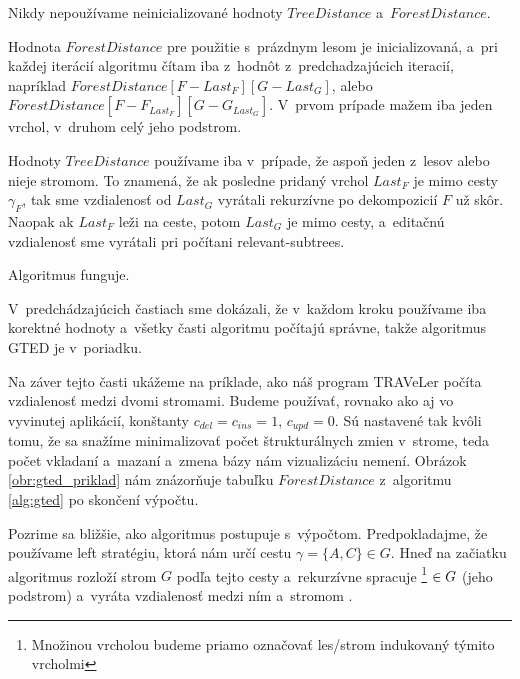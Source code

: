 \begin{lemma}
  Nikdy nepoužívame neinicializované hodnoty $TreeDistance$ a~$ForestDistance$.
\end{lemma}

\begin{dukaz}
  Hodnota $ForestDistance$ pre použitie s~prázdnym lesom je inicializovaná, a~pri každej iterácií
  algoritmu čítam iba z~hodnôt z~predchadzajúcich iteracií, napríklad
  $ForestDistance[F - Last_{F}][G - Last_{G}]$, alebo $ForestDistance[F - F_{Last_{F}}][G - G_{Last_{G}}]$.
  V~prvom prípade mažem iba jeden vrchol, v~druhom celý jeho podstrom.

  Hodnoty $TreeDistance$ používame iba v~prípade, že aspoň jeden z~lesov  alebo  nieje stromom.
  To znamená, že ak posledne pridaný vrchol $Last_{F}$ je mimo cesty $\gamma_{F}$, tak sme vzdialenosť
  od $Last_{G}$ vyrátali rekurzívne po dekompozicií $F$ už skôr.
  Naopak ak $Last_{F}$ leži na ceste, potom $Last_{G}$ je mimo cesty, a~editačnú vzdialenosť
  sme vyrátali pri počítani relevant-subtrees.
\end{dukaz}

\begin{dusl}
  Algoritmus funguje.
\end{dusl}

\begin{dukaz}
  V~predchádzajúcich častiach sme dokázali, že v~každom kroku používame iba korektné hodnoty
  a~všetky časti algoritmu počítajú správne, takže algoritmus GTED je v~poriadku.
\end{dukaz}

Na záver tejto časti ukážeme na príklade, ako náš program TRAVeLer počíta vzdialenosť
medzi dvomi stromami. Budeme používať, rovnako ako aj vo vyvinutej aplikácií,
konštanty $c_{del} = c_{ins} = 1$, $c_{upd} = 0$. Sú nastavené tak
kvôli tomu, že sa snažíme minimalizovať počet štrukturálnych zmien v~strome, teda
počet vkladaní a~mazaní a~zmena bázy nám vizualizáciu nemení.
Obrázok \ref{obr:gted_priklad} nám znázorňuje tabuľku $ForestDistance$ z~algoritmu
\ref{alg:gted} po skončení výpočtu.

Pozrime sa bližšie, ako algoritmus postupuje s~výpočtom. Predpokladajme, že
používame left stratégiu, ktorá nám určí cestu $\gamma = \{A, C\} \in G$.
Hneď na začiatku algoritmus rozloží strom $G$ podľa tejto cesty a~rekurzívne
spracuje \footnote{Množinou vrcholou budeme priamo označovať les/strom
indukovaný týmito vrcholmi} $\in G$ (jeho podstrom) a~vyráta vzdialenosť
medzi ním a~stromom .

